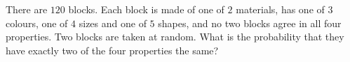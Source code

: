 There are $120$ blocks. Each block is made of one of $2$ materials, has one of $3$ colours, one of $4$ sizes and one of $5$ shapes, and no two blocks agree in all four properties. Two blocks are taken at random. What is the probability that they have exactly two of the four properties the same?
